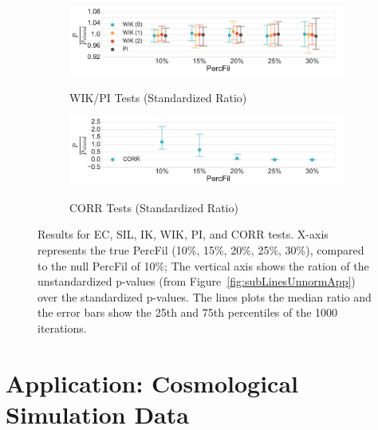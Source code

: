 \documentclass[12pt]{article}
\begin{document}
\begin{center}
\begin{figure}[htp!]
\begin{subfigure}{.47\textwidth}
      \label{fig:sub_contour_normed}
    \end{subfigure}
    \begin{subfigure}{.47\textwidth}
      \centering
      \caption{WIK/PI Tests (Standardized Ratio)}
      \includegraphics[height = .78in]{figure_8_joint_weighted_contour_group.pdf}
      \label{fig:sub_weight_normed}
    \end{subfigure}
    \begin{subfigure}{.47\textwidth}
      \caption{CORR Tests (Standardized Ratio)}
      \includegraphics[height = .78in]{figure_8_joint_correlation_group.pdf}
      \label{fig:sub_corr_normed}
    \end{subfigure}
    \caption{Results for EC, SIL, IK, WIK, PI, and CORR tests. X-axis represents the true PercFil (10\%, 15\%, 20\%, 25\%, 30\%), compared to the null PercFil of 10\%; The vertical axis shows the ration of the unstandardized p-values (from Figure~\ref{fig:subLinesUnnormApp}) over the standardized p-values. The lines plots the median ratio and the error bars show the 25th and 75th percentiles of the 1000 iterations. 
    }
    \label{fig:subLinesNormApp}
  \end{figure}
\end{center}


\section{Application: Cosmological Simulation Data}
\label{sec:application}
\end{document}
